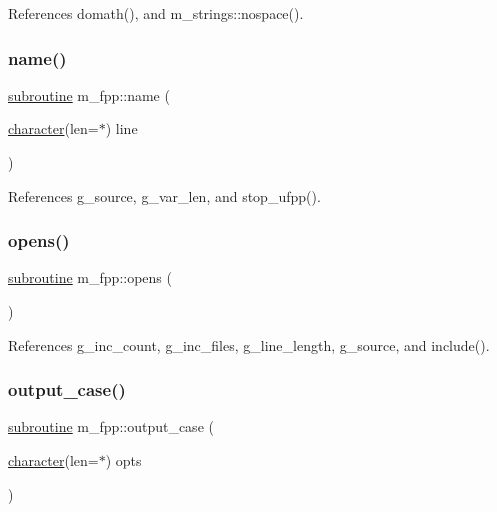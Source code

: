 References domath(), and m\+\_\+strings\+::nospace().

\mbox{\label{namespacem__fpp_ac32c830615f875efaf8678759daa7f39}} 
\subsubsection{\texorpdfstring{name()}{name()}}
{\footnotesize\ttfamily \hyperlink{M__stopwatch_83_8txt_acfbcff50169d691ff02d4a123ed70482}{subroutine} m\+\_\+fpp\+::name (\begin{DoxyParamCaption}\item[{\hyperlink{option__stopwatch_83_8txt_abd4b21fbbd175834027b5224bfe97e66}{character}(len=$\ast$)}]{line }\end{DoxyParamCaption})}



References g\+\_\+source, g\+\_\+var\+\_\+len, and stop\+\_\+ufpp().

\mbox{\label{namespacem__fpp_a74802eb09b223cb8856d01e9247ff46e}} 
\subsubsection{\texorpdfstring{opens()}{opens()}}
{\footnotesize\ttfamily \hyperlink{M__stopwatch_83_8txt_acfbcff50169d691ff02d4a123ed70482}{subroutine} m\+\_\+fpp\+::opens (\begin{DoxyParamCaption}{ }\end{DoxyParamCaption})}



References g\+\_\+inc\+\_\+count, g\+\_\+inc\+\_\+files, g\+\_\+line\+\_\+length, g\+\_\+source, and include().

\mbox{\label{namespacem__fpp_aeab3b5145d977b953ea972b2882e442a}} 
\subsubsection{\texorpdfstring{output\+\_\+case()}{output\_case()}}
{\footnotesize\ttfamily \hyperlink{M__stopwatch_83_8txt_acfbcff50169d691ff02d4a123ed70482}{subroutine} m\+\_\+fpp\+::output\+\_\+case (\begin{DoxyParamCaption}\item[{\hyperlink{option__stopwatch_83_8txt_abd4b21fbbd175834027b5224bfe97e66}{character}(len=$\ast$)}]{opts }\end{DoxyParamCaption})}



